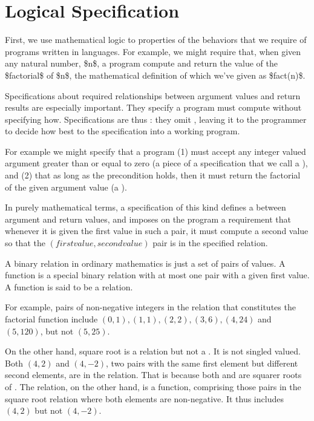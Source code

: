 \documentclass[letterpaper,10pt,english]{sphinxmanual}
\begin{document}
\section{Logical Specification}
\label{\detokenize{05-putting-it-together:logical-specification}}
First, we use mathematical logic to  properties
of the behaviors that we require of programs written in 
languages. For example, we might require that, when given any natural
number, \$n\$, a program compute and return the value of the \$factorial\$
of \$n\$, the mathematical definition of which we’ve given as \$fact(n)\$.

Specifications about required relationships between argument values
and return results are especially important. They specify  a
program must compute without specifying how. Specifications are thus
: they omit , leaving it to the
programmer to decide how best to  the specification into a
working program.

For example we might specify that a program (1) must accept any
integer valued argument greater than or equal to zero (a piece of a
specification that we call a ), and (2) that as long as
the precondition holds, then it must return the factorial of the given
argument value (a ).

In purely mathematical terms, a specification of this kind defines a
 between argument and return values, and imposes on
the program a requirement that whenever it is given the first value in
such a pair, it must compute a second value so that the \((first
value, second value)\) pair is in the specified relation.

A binary relation in ordinary mathematics is just a set of pairs of
values. A function is a special binary relation with at most one pair
with a given first value. A function is said to be a 
relation.

For example, pairs of non-negative integers in the relation that
constitutes the factorial function include \((0,1), (1,1), (2,2),
(3,6), (4,24)\) and \((5,120)\), but not \((5,25)\).

On the other hand, square root is a relation but not a . It
is not singled valued. Both \((4,2)\) and \((4,-2)\), two
pairs with the same first element but different second elements, are
in the relation. That is because both  and  are squarer roots
of .  The  relation, on the other hand, is a
function, comprising those pairs in the square root relation where
both elements are non-negative. It thus includes \((4,2)\) but
not  \((4,-2)\).
\end{document}
